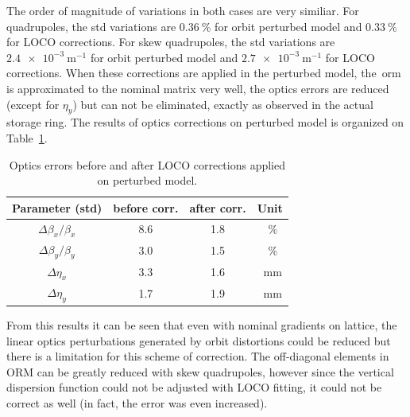 The order of magnitude of variations in both cases are very similiar. For quadrupoles, the std variations are $\SI{0.36}{\%}$ for orbit perturbed model and $\SI{0.33}{\%}$ for LOCO corrections. For skew quadrupoles, the std variations are $\SI{2.4e-3}{\meter^{-1}}$ for orbit perturbed model and $\SI{2.7e-3}{\meter^{-1}}$ for LOCO corrections. When these corrections are applied in the perturbed model, the~\gls{orm} is approximated to the nominal matrix very well, the optics errors are reduced (except for $\eta_y$) but can not be eliminated, exactly as observed in the actual storage ring. The results of optics corrections on perturbed model is organized on Table~\ref{tab:params_corr}.
\begin{table}[h!]
    \centering
    \caption{Optics errors before and after LOCO corrections applied on perturbed model.}
    \label{tab:params_corr}
    \begin{tabular}{cccc}
        \toprule\toprule
        Parameter (std) & before corr. & after corr. & Unit\\
        \hline
        $\Delta\beta_x/\beta_x$ & \SI{8.6}{} & \SI{1.8}{} & \SI{}{\%}\\
        $\Delta\beta_y/\beta_y$ & \SI{3.0}{} & \SI{1.5}{} & \SI{}{\%}\\
        $\Delta\eta_x$ & \SI{3.3}{} & \SI{1.6}{} & \SI{}{\milli\meter} \\
        $\Delta\eta_y$ & \SI{1.7}{} & \SI{1.9}{} & \SI{}{\milli\meter}\\    
        \bottomrule\bottomrule
    \end{tabular}
\end{table}


From this results it can be seen that even with nominal gradients on lattice, the linear optics perturbations generated by orbit distortions could be reduced but there is a limitation for this scheme of correction. The off-diagonal elements in ORM can be greatly reduced with skew quadrupoles, however since the vertical dispersion function could not be adjusted with LOCO fitting, it could not be correct as well (in fact, the error was even increased). 

